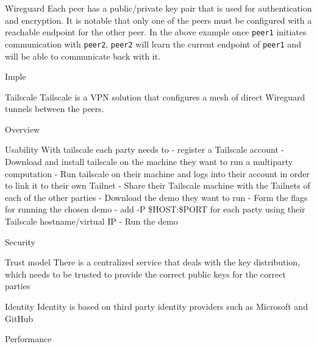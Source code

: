 \begin{frame}[fragile]{Wireguard}
Each peer has a public/private key pair that is used for authentication
and encryption. It is notable that only one of the peers must be
configured with a reachable endpoint for the other peer. In the above
example once \texttt{peer1} initiates communication with \texttt{peer2},
\texttt{peer2} will learn the current endpoint of \texttt{peer1} and
will be able to communicate back with it.

\begin{block}{Imple}
\protect\hypertarget{imple}{}
\end{block}
\end{frame}

\begin{frame}{Tailscale}
\protect\hypertarget{tailscale}{}
Tailscale is a VPN solution that configures a mesh of direct Wireguard
tunnels between the peers.

\begin{block}{Overview}
\protect\hypertarget{overview}{}
\end{block}

\begin{block}{Usability}
\protect\hypertarget{usability}{}
With tailscale each party needs to - register a Tailscale account -
Download and install tailscale on the machine they want to run a
multiparty computation - Run tailscale on their machine and logs into
their account in order to link it to their own Tailnet - Share their
Tailscale machine with the Tailnets of each of the other parties -
Download the demo they want to run - Form the flags for running the
chosen demo - add -P \$HOST:\$PORT for each party using their Tailscale
hostname/virtual IP - Run the demo
\end{block}

\begin{block}{Security}
\protect\hypertarget{security}{}
\begin{block}{Trust model}
\protect\hypertarget{trust-model}{}
There is a centralized service that deals with the key distribution,
which needs to be trusted to provide the correct public keys for the
correct parties
\end{block}

\begin{block}{Identity}
\protect\hypertarget{identity}{}
Identity is based on third party identity providers such as Microsoft
and GitHub
\end{block}
\end{block}

\begin{block}{Performance}
\protect\hypertarget{performance}{}
\end{block}
\end{frame}
